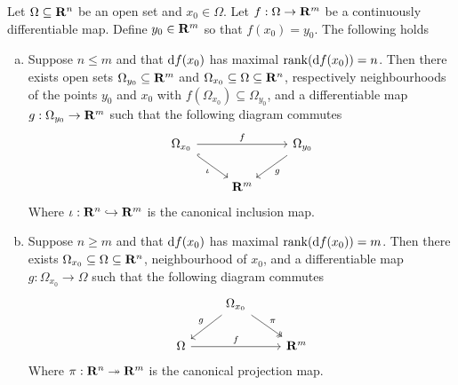 \begin{theorem}
  \label{thm:maximal-rank-theorem}
  Let \(\Omega \subseteq \mathbf{R}^n\) be an open set and \(x_0 \in \Omega\). Let \(f: \Omega \to \mathbf{R}^m\) be a
  continuously differentiable map. Define \(y_0 \in \mathbf{R}^m\) so that \(f(x_0) =
  y_0\). The following holds
  \begin{enumerate}[(a).]\setlength\itemsep{0em}
    \item Suppose \(n \leq m\) and that \(\mathrm{d} f(x_0)\) has maximal
      \(\operatorname{rank}(\mathrm{d} f(x_{0})) = n\). Then there exists open sets \(\Omega_{y_0} \subseteq
      \mathbf{R}^m\) and \(\Omega_{x_0} \subseteq \Omega \subseteq \mathbf{R}^n\), respectively neighbourhoods of the points
      \(y_0\) and \(x_0\) with \(f(\Omega_{x_0}) \subseteq \Omega_{y_0}\), and a differentiable
      map \(g: \Omega_{y_0} \to \mathbf{R}^m\) such that the following diagram commutes
      \[
        \begin{tikzcd}
          \Omega_{x_{0}} \ar[rr, "f"] \ar[dr, hook, swap, "\iota"]
          & &\Omega_{y_0} \ar[dl, "g"] \\
          &\R^m &
        \end{tikzcd}
      \]
      Where \(\iota: \mathbf{R}^n \hookrightarrow \mathbf{R}^m\) is the canonical inclusion map.
    \item Suppose \(n \geq m\) and that \(\mathrm{d} f(x_0)\) has maximal
      \(\operatorname{rank}(\mathrm{d} f(x_0)) = m\). Then there exists \(\Omega_{x_0} \subseteq \Omega \subseteq \mathbf{R}^n\),
      neighbourhood of \(x_0\), and a differentiable map \(g: \Omega_{x_{0}} \to \Omega\)
      such that the following diagram commutes
      \[
        \begin{tikzcd}
          &\Omega_{x_0} \ar[dr, two heads, "\pi"] \ar[ld, swap, "g"] & \\
          \Omega \ar[rr, "f"] & &\R^m
        \end{tikzcd}
      \]
      Where \(\pi: \mathbf{R}^n \twoheadrightarrow \mathbf{R}^m\) is the canonical projection map.
  \end{enumerate}
\end{theorem}

